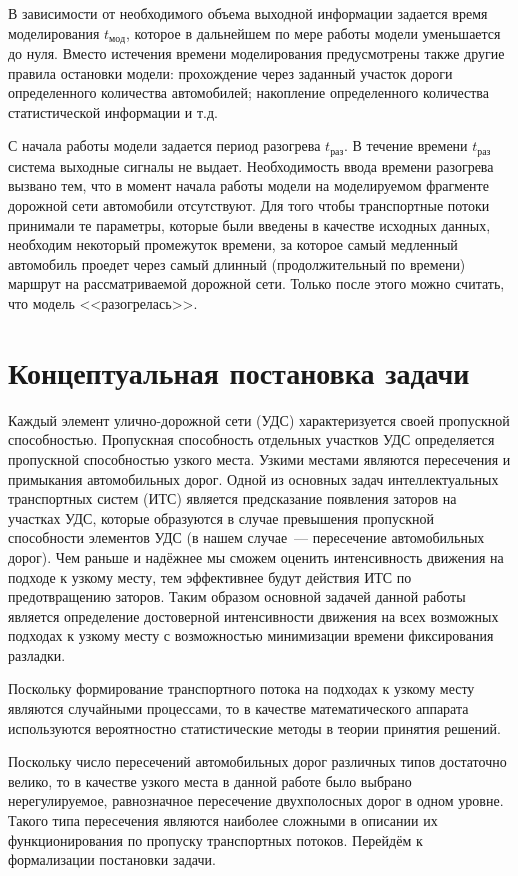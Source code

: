 \documentclass[a4paper,14pt]{article}
\begin{document}
В зависимости от необходимого объема выходной информации задается время моделирования $t_{мод}$, которое в дальнейшем по мере работы модели уменьшается до нуля. Вместо истечения времени моделирования предусмотрены также другие правила остановки модели: прохождение через заданный участок дороги определенного количества автомобилей; накопление определенного количества статистической информации и т.д.

С начала работы модели задается период разогрева $t_{раз}$. В течение времени $t_{раз}$ система выходные сигналы не выдает. Необходимость ввода времени разогрева вызвано тем, что в момент начала работы модели на моделируемом фрагменте дорожной сети автомобили отсутствуют. Для того чтобы транспортные потоки принимали те параметры, которые были введены в качестве исходных данных, необходим некоторый промежуток времени, за которое самый медленный автомобиль проедет через самый длинный (продолжительный по времени) маршрут на рассматриваемой дорожной сети. Только после этого можно считать, что модель <<разогрелась>>. 

 


\section{Концептуальная постановка задачи}

Каждый элемент улично-дорожной сети (УДС) характеризуется своей пропускной способностью. Пропускная способность отдельных участков УДС определяется пропускной способностью узкого места. Узкими местами являются пересечения и примыкания автомобильных дорог. Одной из основных задач интеллектуальных транспортных систем (ИТС) является предсказание появления заторов на участках УДС, которые образуются в случае превышения пропускной способности элементов УДС (в нашем случае~--- пересечение автомобильных дорог). Чем раньше и надёжнее мы сможем оценить интенсивность движения на подходе к узкому месту, тем эффективнее будут действия ИТС по предотвращению заторов. Таким образом основной задачей данной работы является определение достоверной интенсивности движения на всех возможных подходах к узкому месту с возможностью минимизации времени фиксирования разладки. 

Поскольку формирование транспортного потока на подходах к узкому месту являются случайными процессами, то в качестве математического аппарата используются вероятностно статистические методы в теории принятия решений.

Поскольку число пересечений автомобильных дорог различных типов достаточно велико, то в качестве узкого места в данной работе было выбрано нерегулируемое, равнозначное пересечение двухполосных дорог в одном уровне. Такого типа пересечения являются наиболее сложными в описании их функционирования по пропуску транспортных потоков. Перейдём к формализации постановки задачи.
\end{document}
